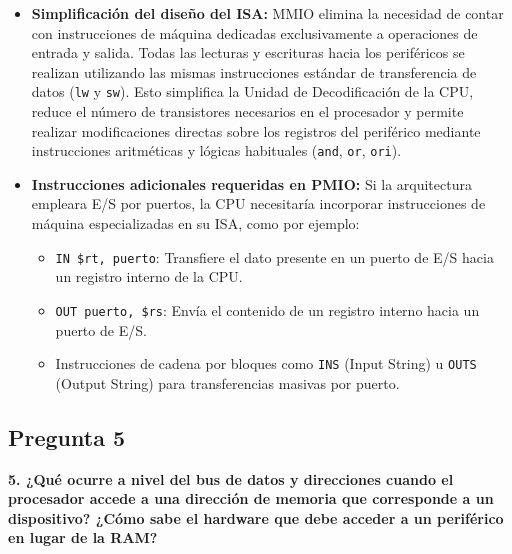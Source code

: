 \documentclass[12pt, letterpaper]{article}
\begin{document}
\begin{itemize}
    \item \textbf{Simplificación del diseño del ISA:} 
    MMIO elimina la necesidad de contar con instrucciones de máquina dedicadas exclusivamente a operaciones de entrada y salida. Todas las lecturas y escrituras hacia los periféricos se realizan utilizando las mismas instrucciones estándar de transferencia de datos (\texttt{lw} y \texttt{sw}). Esto simplifica la Unidad de Decodificación de la CPU, reduce el número de transistores necesarios en el procesador y permite realizar modificaciones directas sobre los registros del periférico mediante instrucciones aritméticas y lógicas habituales (\texttt{and}, \texttt{or}, \texttt{ori}).
    
    \item \textbf{Instrucciones adicionales requeridas en PMIO:}
    Si la arquitectura empleara E/S por puertos, la CPU necesitaría incorporar instrucciones de máquina especializadas en su ISA, como por ejemplo:
    \begin{itemize}
        \item \texttt{IN \$rt, puerto}: Transfiere el dato presente en un puerto de E/S hacia un registro interno de la CPU.
        \item \texttt{OUT puerto, \$rs}: Envía el contenido de un registro interno hacia un puerto de E/S.
        \item Instrucciones de cadena por bloques como \texttt{INS} (Input String) u \texttt{OUTS} (Output String) para transferencias masivas por puerto.
    \end{itemize}
\end{itemize}

\hr

\subsection*{Pregunta 5}
\textbf{5. ¿Qué ocurre a nivel del bus de datos y direcciones cuando el procesador accede a una dirección de memoria que corresponde a un dispositivo? ¿Cómo sabe el hardware que debe acceder a un periférico en lugar de la RAM?}
\end{document}
